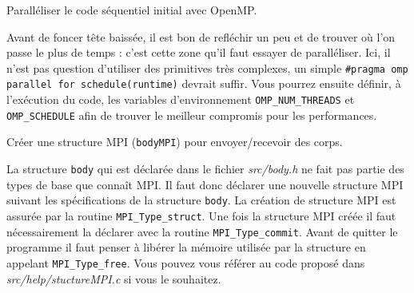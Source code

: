 \begin{questions}
	\question Paralléliser le code séquentiel initial avec OpenMP.
	\begin{solution}
		Avant de foncer tête baissée, il est bon de refléchir un peu et de trouver où l'on passe le plus de temps : c'est cette zone qu'il faut essayer de paralléliser.
		Ici, il n'est pas question d'utiliser des primitives très complexes, un simple \texttt{\#pragma omp parallel for schedule(runtime)} devrait suffir.
		Vous pourrez ensuite définir, à l'exécution du code, les variables d'environnement \texttt{OMP\_NUM\_THREADS} et \texttt{OMP\_SCHEDULE} afin de trouver le meilleur compromis pour les performances. 
	\end{solution}

	\question Créer une structure MPI (\texttt{bodyMPI}) pour envoyer/recevoir des corps.
	\begin{solution}
		La structure \texttt{body} qui est déclarée dans le fichier \textit{src/body.h} ne fait pas partie des types de base que connaît MPI.
		Il faut donc déclarer une nouvelle structure MPI suivant les spécifications de la structure \texttt{body}.
		La création de structure MPI est assurée par la routine \texttt{MPI\_Type\_struct}.
		Une fois la structure MPI créée il faut nécessairement la déclarer avec la routine \texttt{MPI\_Type\_commit}.
		Avant de quitter le programme il faut penser à libérer la mémoire utilisée par la structure en appelant \texttt{MPI\_Type\_free}.
		Vous pouvez vous référer au code proposé dans \textit{src/help/stuctureMPI.c} si vous le souhaitez.
	\end{solution}


\end{questions}
